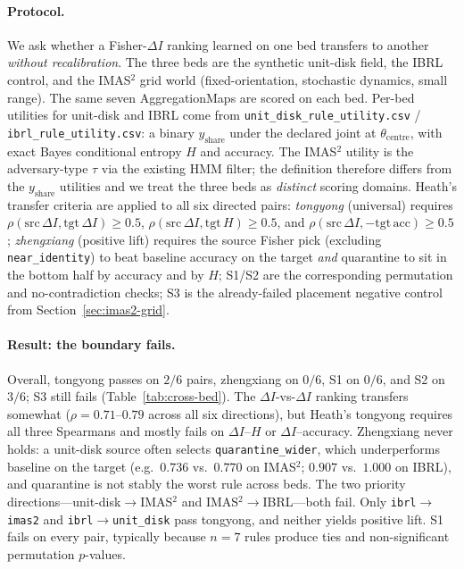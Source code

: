 \documentclass[11pt,a4paper]{article}
\begin{document}
\paragraph{Protocol.}
We ask whether a Fisher-$\Delta I$ ranking learned on one bed transfers to
another \emph{without recalibration}. The three beds are the synthetic
unit-disk field, the IBRL control, and the IMAS$^2$ grid world
(fixed-orientation, stochastic dynamics, small range). The same seven
AggregationMaps are scored on each bed. Per-bed utilities for unit-disk and
IBRL come from
\texttt{unit\_disk\_rule\_utility.csv} /
\texttt{ibrl\_rule\_utility.csv}: a binary $y_{\mathrm{share}}$ under the
declared joint at $\theta_{\mathrm{centre}}$, with exact Bayes conditional
entropy $H$ and accuracy. The IMAS$^2$ utility is the adversary-type $\tau$
via the existing HMM filter; the definition therefore differs from the
$y_{\mathrm{share}}$ utilities and we treat the three beds as
\emph{distinct} scoring domains. Heath's transfer criteria are applied to
all six directed pairs:
\emph{tongyong} (universal) requires
$\rho(\mathrm{src}\,\Delta I,\mathrm{tgt}\,\Delta I)\ge 0.5$,
$\rho(\mathrm{src}\,\Delta I,\mathrm{tgt}\,H)\ge 0.5$, and
$\rho(\mathrm{src}\,\Delta I,-\mathrm{tgt}\,\mathrm{acc})\ge 0.5$;
\emph{zhengxiang} (positive lift) requires the source Fisher pick
(excluding \texttt{near\_identity}) to beat baseline accuracy on the target
\emph{and} quarantine to sit in the bottom half by accuracy and by $H$;
S1/S2 are the corresponding permutation and no-contradiction checks; S3 is
the already-failed placement negative control from
Section~\ref{sec:imas2-grid}.

\paragraph{Result: the boundary fails.}
Overall, tongyong passes on $2/6$ pairs, zhengxiang on $0/6$, S1 on $0/6$,
and S2 on $3/6$; S3 still fails (Table~\ref{tab:cross-bed}). The
$\Delta I$-vs-$\Delta I$ ranking transfers somewhat
($\rho=0.71$--$0.79$ across all six directions), but Heath's tongyong
requires all three Spearmans and mostly fails on $\Delta I$--$H$ or
$\Delta I$--accuracy. Zhengxiang never holds: a unit-disk source often
selects \texttt{quarantine\_wider}, which underperforms baseline on the
target (e.g.\ $0.736$ vs.\ $0.770$ on IMAS$^2$; $0.907$ vs.\ $1.000$ on
IBRL), and quarantine is not stably the worst rule across beds. The two
priority directions---unit-disk$\to$IMAS$^2$ and IMAS$^2\to$IBRL---both
fail. Only \texttt{ibrl}$\to$\texttt{imas2} and
\texttt{ibrl}$\to$\texttt{unit\_disk} pass tongyong, and neither yields
positive lift. S1 fails on every pair, typically because $n=7$ rules
produce ties and non-significant permutation $p$-values.
\end{document}
